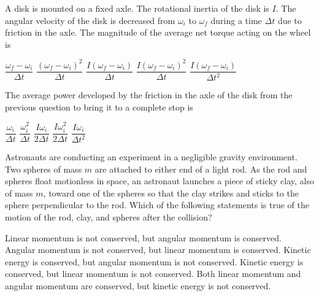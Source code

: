 \documentclass{../../oss-apphys-exam}
\begin{document}
\begin{multicols*}{2}
\begin{questions}
    \question A disk is mounted on a fixed axle. The rotational inertia of the
    disk is $I$. The angular velocity of the disk is decreased from $\omega_i$
    to $\omega_f$ during a time $\Delta t$ due to friction in the axle. The
    magnitude of the average net torque acting on the wheel is
    \begin{choices}
      \choice $\dfrac{\omega_f-\omega_i}{\Delta t}$
      \choice $\dfrac{(\omega_f-\omega_i)^2}{\Delta t}$
      \choice $\dfrac{I(\omega_f-\omega_i)}{\Delta t}$
      \choice $\dfrac{I(\omega_f-\omega_i)^2}{\Delta t}$
      \choice $\dfrac{I(\omega_f-\omega_i)}{\Delta t^2}$
    \end{choices}
    
  \question The average power developed by the friction in the axle of the disk
    from the previous question to bring it to a complete stop is
    \begin{choices}
      \choice $\dfrac{\omega_i}{\Delta t}$
      \choice $\dfrac{\omega_i^2}{\Delta t}$
      \choice $\dfrac{I\omega_i}{2\Delta t}$
      \choice $\dfrac{I\omega_i^2}{2\Delta t}$
      \choice $\dfrac{I\omega_i}{\Delta t^2}$
    \end{choices}    
    \columnbreak
    
    \question Astronauts are conducting an experiment in a negligible gravity
    environment. Two spheres of mass $m$ are attached to either end of a light
    rod. As the rod and spheres float motionless in space, an astronaut
    launches a piece of sticky clay, also of mass $m$, toward one of the spheres
    so that the clay strikes and sticks to the sphere perpendicular to the rod.
    Which of the following statements is true of the motion of the rod, clay,
    and spheres after the collision?
    \begin{center}
    \end{center}
    \begin{choices}
      \choice Linear momentum is not conserved, but angular momentum is
      conserved.
      \choice Angular momentum is not conserved, but linear momentum is
      conserved.
      \choice Kinetic energy is conserved, but angular momentum is not
      conserved.
      \choice Kinetic energy is conserved, but linear momentum is not conserved.
      \choice Both linear momentum and angular momentum are conserved, but
      kinetic energy is not conserved.
    \end{choices}
    \vspace{.7in}
      

\end{questions}
\end{multicols*}
\end{document}
